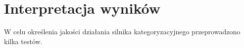 \chapter{Interpretacja wyników}

W celu określenia jakości działania silnika kategoryzacyjnego przeprowadzono kilka testów. 